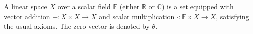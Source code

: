 A linear space $X$ over a scalar field $\mathbb{F}$ (either $\mathbb{R}$ or $\mathbb{C}$) is a set equipped with vector addition $+: X \times X \to X$ and scalar multiplication $\cdot: \mathbb{F} \times X \to X$, satisfying the usual axioms. The zero vector is denoted by $\theta$.